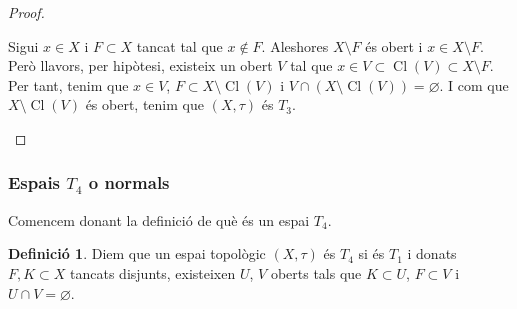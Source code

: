 \documentclass[10pt,a4paper]{article}
\theoremstyle{definition}
\newtheorem{definition}[theorem]{Definició}
\DeclareMathOperator{\Cl}{Cl} %
\begin{document}
\begin{proof}
\begin{itemize}[leftmargin=2cm]
                  Sigui $x\in X$ i $F\subset X$ tancat tal que $x\notin F$. Aleshores $X\setminus F$ és obert i $x\in X\setminus F$. Però llavors, per hipòtesi, existeix un obert $V$ tal que $x\in V\subset \Cl(V)\subset X\setminus F$. Per tant, tenim que $x\in V$, $F\subset X\setminus \Cl(V)$ i $V\cap(X\setminus\Cl(V))=\varnothing$. I com que $X\setminus\Cl(V)$ és obert, tenim que $(X,\tau)$ és $T_3$.
      \end{itemize}
\end{proof}

\subsubsection*{Espais $T_4$ o normals}

Comencem donant la definició de què és un espai $T_4$.
\begin{definition}
      Diem que un espai topològic $(X,\tau)$ és $T_4$ si és $T_1$ i donats $F, K\subset X$ tancats disjunts, existeixen $U$, $V$ oberts tals que $K\subset U$, $F\subset V$ i $U\cap V=\varnothing$.
\end{definition}
\end{document}
